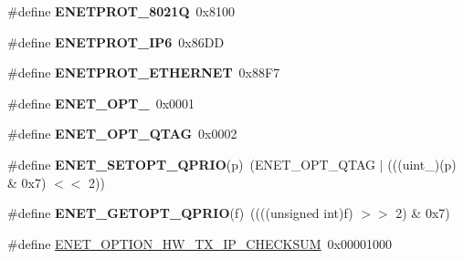 \begin{DoxyCompactItemize}
\item 
\#define {\bfseries E\+N\+E\+T\+P\+R\+O\+T\+\_\+8021Q}~0x8100\hypertarget{group__enet__rtcs__adaptor_gaf13b8822450b19c254b8015b49bebef8}{}\label{group__enet__rtcs__adaptor_gaf13b8822450b19c254b8015b49bebef8}

\item 
\#define {\bfseries E\+N\+E\+T\+P\+R\+O\+T\+\_\+\+I\+P6}~0x86\+DD\hypertarget{group__enet__rtcs__adaptor_gab5bc90025e9c2b60c79e1353889abfd4}{}\label{group__enet__rtcs__adaptor_gab5bc90025e9c2b60c79e1353889abfd4}

\item 
\#define {\bfseries E\+N\+E\+T\+P\+R\+O\+T\+\_\+\+E\+T\+H\+E\+R\+N\+ET}~0x88\+F7\hypertarget{group__enet__rtcs__adaptor_ga309f21e3f515072f552d979118ec46fc}{}\label{group__enet__rtcs__adaptor_ga309f21e3f515072f552d979118ec46fc}

\item 
\#define {\bfseries E\+N\+E\+T\+\_\+\+O\+P\+T\+\_}~0x0001\hypertarget{group__enet__rtcs__adaptor_ga3a007bbb3db2f4166822ce5625c3bf8b}{}\label{group__enet__rtcs__adaptor_ga3a007bbb3db2f4166822ce5625c3bf8b}

\item 
\#define {\bfseries E\+N\+E\+T\+\_\+\+O\+P\+T\+\_\+Q\+T\+AG}~0x0002\hypertarget{group__enet__rtcs__adaptor_ga6ac1f1ee6a25b913e1123ee303ec7293}{}\label{group__enet__rtcs__adaptor_ga6ac1f1ee6a25b913e1123ee303ec7293}

\item 
\#define {\bfseries E\+N\+E\+T\+\_\+\+S\+E\+T\+O\+P\+T\+\_\+Q\+P\+R\+IO}(p)~(E\+N\+E\+T\+\_\+\+O\+P\+T\+\_\+Q\+T\+AG $\vert$ (((uint\+\_)(p) \& 0x7) $<$$<$ 2))\hypertarget{group__enet__rtcs__adaptor_gabaed75772dda14198b5cab7a9bab7a7f}{}\label{group__enet__rtcs__adaptor_gabaed75772dda14198b5cab7a9bab7a7f}

\item 
\#define {\bfseries E\+N\+E\+T\+\_\+\+G\+E\+T\+O\+P\+T\+\_\+Q\+P\+R\+IO}(f)~((((unsigned int)f) $>$$>$ 2) \& 0x7)\hypertarget{group__enet__rtcs__adaptor_ga90b7d02dcf2421cd0c0dfbac847fbbd5}{}\label{group__enet__rtcs__adaptor_ga90b7d02dcf2421cd0c0dfbac847fbbd5}

\item 
\#define \hyperlink{group__enet__rtcs__adaptor_gaddf4e1e47678a92563738b4bf9d99cd8}{E\+N\+E\+T\+\_\+\+O\+P\+T\+I\+O\+N\+\_\+\+H\+W\+\_\+\+T\+X\+\_\+\+I\+P\+\_\+\+C\+H\+E\+C\+K\+S\+UM}~0x00001000\hypertarget{group__enet__rtcs__adaptor_gaddf4e1e47678a92563738b4bf9d99cd8}{}\label{group__enet__rtcs__adaptor_gaddf4e1e47678a92563738b4bf9d99cd8}


\end{DoxyCompactItemize}
